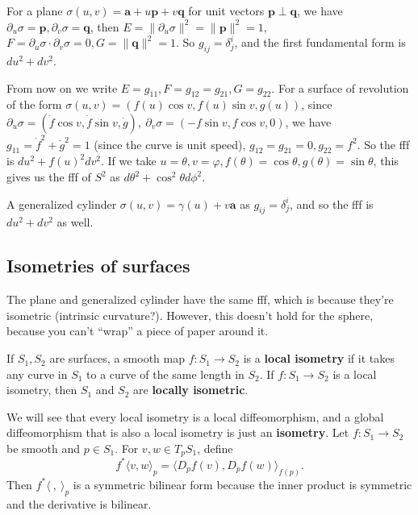 \begin{example}
    For a plane $\sigma(u,v)=\mathbf a+u\mathbf p+v\mathbf q$ for unit vectors $\mathbf p\perp \mathbf q$, we have $\partial_u\sigma =\mathbf p, \partial _v\sigma=\mathbf q$, then $E=\|\partial _u\sigma\|^2=\|\mathbf p\|^2=1$, $F=\partial _u\sigma \cdot \partial _v\sigma=0, G=\|\mathbf q\|^2=1$. So $g_{ij}=\delta^i _j $, and the first fundamental form is $du^2+dv^2$.
\end{example}
\begin{example}
    From now on we write $E=g_{11}, F=g_{12}=g_{21}, G=g_{22}$. For a surface of revolution of the form $\sigma(u,v)=(f(u)\cos v, f(u) \sin v, g(u))$, since $\partial _u\sigma=(\dot f \cos v,\dot f \sin v,\dot g),\ \partial _v\sigma=(-f \sin v, f \cos v, 0)$, we have $g_{11}=\dot f^2+\dot g^2=1$ (since the curve is unit speed), $g_{12}=g_{21}=0,g_{22}=f^2$. So the fff is $du^2+f(u)^2dv^2$. If we take $u=\theta, v=\varphi , f(\theta)=\cos \theta, g(\theta)=\sin \theta$, this gives us the fff of $S^2$ as $d\theta^2+\cos ^2 \theta d\phi^2$.
\end{example}
\begin{example}
    A generalized cylinder $\sigma(u,v)=\gamma (u)+v\mathbf a$ as $g_{ij}=\delta^i _j $, and so the fff is $du^2+dv^2$ as well.
\end{example}

\subsection{Isometries of surfaces}
The plane and generalized cylinder have the same fff, which is because they're isometric (intrinsic curvature?). However, this doesn't hold for the sphere, because you can't ``wrap'' a piece of paper around it.

\begin{definition}[]
    If $S_1 ,S_2$ are surfaces, a smooth map $f \colon S_1 \to S_2$ is a \textbf{local isometry} if it takes any curve in $S_1$ to a curve of the same length in $S_2$. If $f \colon S_1 \to S_2$ is a local isometry, then $S_1$ and $S_2$ are \textbf{locally isometric}.
\end{definition}
We will see that every local isometry is a local diffeomorphism, and a global diffeomorphism that is also a local isometry is just an \textbf{isometry}. Let $f \colon S_1 \to S_2$ be smooth and $p \in S_1$. For $v,w \in T_p S_1$, define \[
    f^*\langle v,w \rangle _p=\langle D_p f(v),D_p f(w) \rangle _{f(p)}.
\] Then $f^*\langle \ ,\ \rangle _p$ is a symmetric bilinear form because the inner product is symmetric and the derivative is bilinear.

